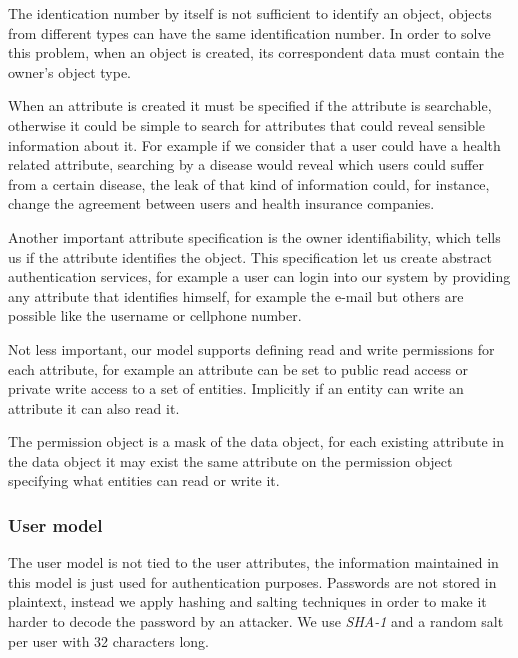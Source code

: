 The identication number by itself is not sufficient to identify an object, objects from different types can have the same identification number. In order to solve this problem, when an object is created, its correspondent data must contain the owner's object type. 

When an attribute is created it must be specified if the attribute is searchable, otherwise it could be simple to search for attributes that could reveal sensible information about it. For example if we consider that a user could have a health related attribute, searching by a disease would reveal which users could suffer from a certain disease, the leak of that kind of information could, for instance, change the agreement between users and health insurance companies.

Another important attribute specification is the owner identifiability, which tells us if the attribute identifies the object. This specification let us create abstract authentication services, for example a user can login into our system by providing any attribute that identifies himself, for example the e-mail but others are possible like the username or cellphone number. 


Not less important, our model supports defining read and write permissions for each attribute, for example an attribute can be set to public read access or private write access to a set of entities. Implicitly if an entity can write an attribute it can also read it.

The permission object is a mask of the data object, for each existing attribute in the data object it may exist the same attribute on the permission object specifying what entities can read or write it.

\subsubsection{User model}

The user model is not tied to the user attributes, the information maintained in this model is just used for authentication purposes. Passwords are not stored in plaintext, instead we apply hashing and salting techniques \cite{password} in order to make it harder to decode the password by an attacker. We use \emph{SHA-1} and a random salt per user with 32 characters long.

